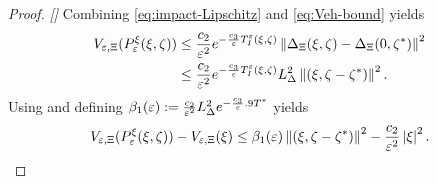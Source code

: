 \begin{proof}{\em []}
  Combining \eqref{eq:impact-Lipschitz} and \eqref{eq:Veh-bound} yields
  \begin{align}
    \nonumber
    V_{\varepsilon, \Xi}(P_{\varepsilon}^{\xi}(\xi, \zeta)) &\leq \frac{c_{2}}{\varepsilon^{2}} e^{-\frac{c_{3}}{\varepsilon} T_{I}^{\varepsilon}(\xi, \zeta)} \left\| \Delta_{\Xi}(\xi, \zeta) - \Delta_{\Xi}(0, \zeta^{*}) \right\|^{2}\\
    &\leq \frac{c_{2}}{\varepsilon^{2}} e^{-\frac{c_{3}}{\varepsilon} T_{I}^{\varepsilon}(\xi, \zeta)} L_{\Delta}^{2} \left\|(\xi, \zeta - \zeta^{*})\right\|^{2}.
  \end{align}
  Using  and defining $\beta_{1}(\varepsilon) := \frac{c_{2}}{\varepsilon^{2}} L_{\Delta}^{2} e^{-\frac{c_{3}}{\varepsilon} .9 T^{*}}$ yields
  \begin{align}
    \label{eq:DVeX-bounds}
    V_{\varepsilon, \Xi}(P_{\varepsilon}^{\xi}(\xi, \zeta)) - V_{\varepsilon, \Xi}(\xi) \leq \beta_{1}(\varepsilon) \left\|(\xi, \zeta - \zeta^{*})\right\|^{2} - \frac{c_{2}}{\varepsilon^{2}} \left|\xi\right|^{2}.
  \end{align}


\end{proof}
